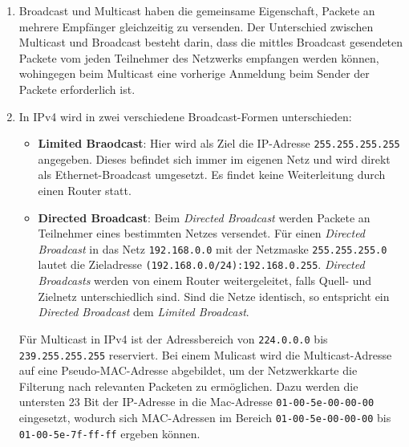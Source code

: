 \documentclass[german,12pt,a4paper]{article}
\begin{document}
\begin{enumerate}

	\item Broadcast und Multicast haben die gemeinsame Eigenschaft, Packete an mehrere Empfänger gleichzeitig zu versenden. 
	Der Unterschied zwischen Multicast und Broadcast besteht darin, dass die mittles Broadcast 
	gesendeten Packete vom jeden Teilnehmer des Netzwerks empfangen werden können, wohingegen beim 
	Multicast eine vorherige Anmeldung beim Sender der Packete erforderlich ist.
	 
	\item In IPv4 wird in zwei verschiedene Broadcast-Formen unterschieden:
		\begin{itemize}
			\item \textbf{Limited Braodcast}: Hier wird als Ziel die IP-Adresse \texttt{255.255.255.255} angegeben. Dieses befindet sich 
			immer im eigenen Netz und wird direkt als Ethernet-Broadcast umgesetzt. Es findet keine Weiterleitung durch einen Router 
			statt.
			\item \textbf{Directed Broadcast}: Beim \textit{Directed Broadcast} werden Packete an Teilnehmer eines bestimmten Netzes versendet.
			Für einen \textit{Directed Broadcast} in das Netz \texttt{192.168.0.0} mit der Netzmaske \texttt{255.255.255.0} lautet die Zieladresse 
			\texttt{(192.168.0.0/24):192.168.0.255}. \textit{Directed Broadcasts} werden von einem Router weitergeleitet, falls Quell- und 
			Zielnetz unterschiedlich sind. Sind die Netze identisch, so entspricht ein \textit{Directed Broadcast} dem \textit{Limited Broadcast}.
		\end{itemize}
		
		
		Für Multicast in IPv4 ist der Adressbereich von \texttt{224.0.0.0} bis \texttt{239.255.255.255} reserviert. Bei einem 
		Mulicast wird die Multicast-Adresse auf eine Pseudo-MAC-Adresse abgebildet, um der Netzwerkkarte die Filterung nach relevanten 
		Packeten zu ermöglichen. Dazu werden die untersten 23 Bit der IP-Adresse in die Mac-Adresse \texttt{01-00-5e-00-00-00} eingesetzt, 
		wodurch sich MAC-Adressen im Bereich \texttt{01-00-5e-00-00-00} bis \texttt{01-00-5e-7f-ff-ff} ergeben können.
		


\end{enumerate}
\end{document}
